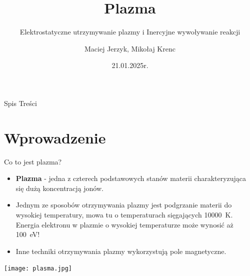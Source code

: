 \documentclass[10pt]{beamer}
\title{Plazma}
\subtitle{Elektrostatyczne utrzymywanie plazmy i Inercyjne wywoływanie reakcji}
\author{Maciej Jerzyk, Mikołaj Krenc}
\date{21.01.2025r.}
\begin{document}
    \begin{frame}
        \titlepage{}
    \end{frame}

    \begin{frame}{Spis Treści}
        \tableofcontents
    \end{frame}

    \section{Wprowadzenie}

        \begin{frame}{Co to jest plazma?}
            \begin{itemize}
                \item \textbf{Plazma} - jedna z czterech podstawowych stanów materii charakteryzująca się dużą koncentracją jonów.
                \item Jednym ze sposobów otrzymywania plazmy jest podgrzanie materii do wysokiej temperatury, mowa tu o temperaturach sięgających 10000\ K. Energia elektronu w plazmie o wysokiej temperaturze może wynosić aż 100\ eV!
                \item Inne techniki otrzymywania plazmy wykorzystują pole magnetyczne.
            \end{itemize}

            \raggedright{}
            \texttt{[image: plasma.jpg]}

        \end{frame}
\end{document}
